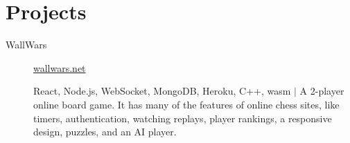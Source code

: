 \documentclass[letterpaper,10pt,oneside]{article}
\begin{document}
\section*{Projects}
\begin{description}
	\item[WallWars]\quad \href{https://wallwars.net}{wallwars.net} \hfill
	
	React, Node.js, WebSocket, MongoDB, Heroku, C++, wasm $|$ A 2-player online board game. It has many of the features of online chess sites, like timers, authentication, watching replays, player rankings, a responsive design, puzzles, and an AI player.

\begin{comment}
	 
	\item[SANA 2.0]\quad  \href{https://github.com/nmamano/SANA}{github.com/nmamano/SANA} \hfill Apr 2020 -- Jun 2020
	
	C++ $|$ Extended the SANA software (mentioned above) to enable alignment-finding between viruses. Refactored 20k+ lines of the codebase and added new features, allowing academic collaborators to run scientific experiments comparing SARS-CoV-2 to other viruses (currently underway).

	\item[ttl-cache]\quad  \href{https://github.com/nmamano/ttlcache}{github.com/nmamano/ttlcache}\hfill  Mar 2020
	
	C++ (templates and C++17 features) $|$ An efficient in-memory key-value cache that supports timeouts. It implements Redis' algorithm to remove expired entries and has an LRU eviction mechanism.
	
	\item[Graph Nearest-Neighbor]\quad  \href{https://github.com/nmamano/NearestNeighborInGraphs}{github.com/nmamano/NearestNeighborInGraphs} \hfill 2018
	 
	 Java $|$ Designed and implemented data structures for matching drivers and passengers on a road network dynamically. Leveraged the topology of road networks to optimize the data structures and scale them to statewide networks with 100k+ edges.  
	\item[Stable Matching Voronoi Diagram]\quad  \href{https://github.com/nmamano/StableMatchingVoronoiDiagram}{github.com/nmamano/StableMatchingVoronoiDiagram} \hfill 2018
	
	C++, OpenGL, Javascript $|$ Designed and implemented clustering algorithms for partitioning data into balanced clusters, and researched their application to gerrymandering prevention: they can partition a geographic region into compact and equal-population districts. Built a desktop application to visualize and benchmark the algorithms.
\end{comment}	
\begin{comment}
	\item[Chespel]\quad  \href{https://github.com/nmamano/Chespel}{github.com/nmamano/Chespel}\hfill 2014
	

\end{comment}
\end{description}
\end{document}
